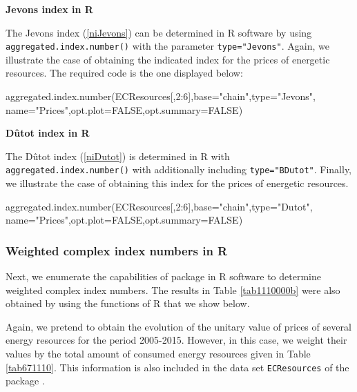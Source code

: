 \vspace*{0.15 cm}\noindent\textbf{Jevons index in R}

\noindent The Jevons index (\ref{niJevons}) can be determined in R software by using  \verb|aggregated.index.number()| with the parameter \verb|type="Jevons"|. Again, we illustrate the case of obtaining the indicated index for the prices of energetic resources. The required code is the one displayed below:

\begin{example}
aggregated.index.number(ECResources[,2:6],base="chain",type="Jevons",
			name="Prices",opt.plot=FALSE,opt.summary=FALSE)
\end{example}



\vspace*{0.15 cm}\noindent\textbf{D\^utot index in R}

\noindent The D\^utot index (\ref{niDutot}) is determined in R with  \verb|aggregated.index.number()| with additionally including \verb|type="BDutot"|. Finally, we illustrate the case of obtaining this index for the prices of energetic resources.

\begin{example}
aggregated.index.number(ECResources[,2:6],base="chain",type="Dutot",
			name="Prices",opt.plot=FALSE,opt.summary=FALSE)
\end{example}

\subsubsection{Weighted complex index numbers in R}

Next, we enumerate the capabilities of  package in R software to determine weighted complex index numbers. The results in Table \ref{tab1110000b} were also obtained by using the functions of R that we show below.

Again, we pretend to obtain the evolution of the unitary value of prices of several energy resources for the period 2005-2015. However, in this case, we weight their values by the total amount of consumed energy resources given in Table \ref{tab671110}. This information is also included in the data set \verb|ECResources| of the package . 


